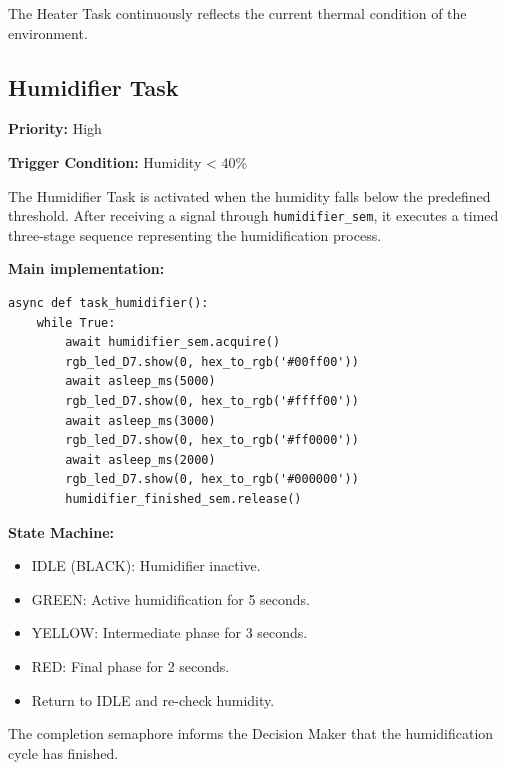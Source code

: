 The Heater Task continuously reflects the current thermal condition of the environment.

\subsection{Humidifier Task}

\textbf{Priority:} High

\textbf{Trigger Condition:} Humidity \textless{} 40\%

The Humidifier Task is activated when the humidity falls below the predefined threshold. After receiving a signal
through \texttt{humidifier\_sem}, it executes a timed three-stage sequence representing the humidification process.

\textbf{Main implementation:}

\begin{lstlisting}
async def task_humidifier():
    while True:
        await humidifier_sem.acquire()
        rgb_led_D7.show(0, hex_to_rgb('#00ff00'))
        await asleep_ms(5000)
        rgb_led_D7.show(0, hex_to_rgb('#ffff00'))
        await asleep_ms(3000)
        rgb_led_D7.show(0, hex_to_rgb('#ff0000'))
        await asleep_ms(2000)
        rgb_led_D7.show(0, hex_to_rgb('#000000'))
        humidifier_finished_sem.release()
\end{lstlisting}

\textbf{State Machine:}

\begin{itemize}
  \item IDLE (BLACK): Humidifier inactive.
  \item GREEN: Active humidification for 5 seconds.
  \item YELLOW: Intermediate phase for 3 seconds.
  \item RED: Final phase for 2 seconds.
  \item Return to IDLE and re-check humidity.
\end{itemize}

The completion semaphore informs the Decision Maker that the humidification cycle has finished.
